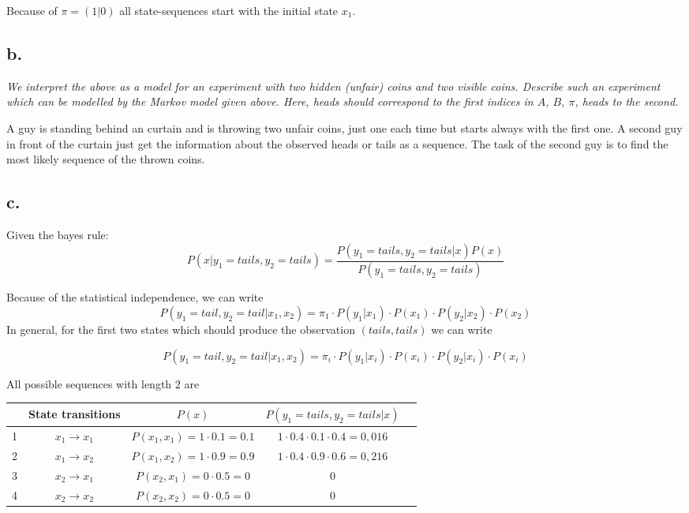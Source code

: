 \documentclass[a4paper, 12pt, titlepage]{article}
\begin{document}
Because of $\pi = (1 | 0)$ all state-sequences start with the initial state $x_1$.
  
\subsection*{b.}


\textit{We interpret the above as a model for an experiment with two hidden (unfair) coins and two visible coins. Describe such an experiment which can be modelled by the Markov model given above. Here, heads should correspond to the first indices in $A$, $B$, $\pi$, heads to the second.} \newline \newline

A guy is standing behind an curtain and is throwing two unfair coins, just one each time but starts always with the first one. A second guy in front of the curtain just get the information about the observed heads or tails as a sequence. The task of the second guy is to find the most likely sequence of the thrown coins.


\subsection*{c.}

Given the bayes rule:
\begin{equation}
   P(x|y_1=tails,y_2=tails) =  \frac{P(y_1=tails,y_2=tails|x)P(x)}{P(y_1=tails,y_2=tails)}
\end{equation}

Because of the statistical independence, we can write
\begin{equation}
  P(y_1=tail,y_2=tail|x_1,x_2) = \pi_1 \cdot P(y_1|x_1) \cdot P(x_1) \cdot P(y_2|x_2) \cdot P(x_2)
\end{equation}
In general, for the first two states which should produce the observation $(tails,tails)$ we can write

\begin{equation}
  P(y_1=tail,y_2=tail|x_1,x_2) = \pi_i \cdot P(y_1|x_i) \cdot P(x_i) \cdot P(y_2|x_i) \cdot P(x_i)
\end{equation}

All possible sequences with length $2$ are

\begin{tabular}{l*{3}{c}r}
              & State transitions & $P(x)$ & $P(y_1=tails,y_2=tails|x) $ \\
\hline
1 &  $x_1 \rightarrow x_1$ & $P(x_1,x_1)= 1\cdot0.1=0.1$ & $ 1\cdot0.4\cdot0.1\cdot0.4=0,016 $\\
2 &  $x_1 \rightarrow x_2$ & $P(x_1,x_2)= 1\cdot0.9=0.9$ & $ 1\cdot0.4\cdot0.9\cdot0.6=0,216 $ \\
3 &  $x_2 \rightarrow x_1$ & $P(x_2,x_1)= 0\cdot0.5=0$ & $ 0 $ \\
4 &  $x_2 \rightarrow x_2$ & $P(x_2,x_2)= 0\cdot0.5=0$ & $ 0 $
 \end{tabular}
\end{document}
